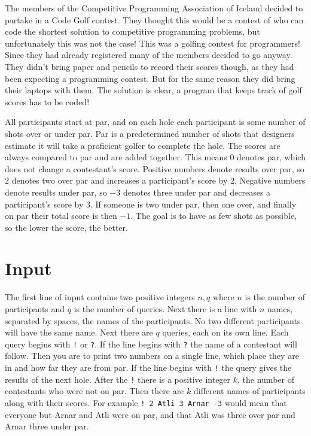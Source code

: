 
The members of the Competitive Programming Association of Iceland decided to partake in a Code Golf contest.
They thought this would be a contest of who can code the shortest solution to competitive programming problems,
but unfortunately this was not the case!
This was a golfing contest for programmers!
Since they had already registered many of the members decided to go anyway.
They didn't bring paper and pencils to record their scores though,
as they had been expecting a programming contest.
But for the same reason they did bring their laptops with them.
The solution is clear, a program that keeps track of golf scores has to be coded!

All participants start at par, and on each hole each participant is some number of shots over or under par.
Par is a predetermined number of shots that designers estimate it will take a proficient golfer to complete the hole.
The scores are always compared to par and are added together.
This means $0$ denotes par, which does not change a contestant's score.
Positive numbers denote results over par, 
so $2$ denotes two over par and increases a participant's score by $2$.
Negative numbers denote results under par, 
so $-3$ denotes three under par and decreases a participant's score by $3$.
If someone is two under par, then one over, and finally on par their total score is then $-1$.
The goal is to have as few shots as possible, so the lower the score, the better.

\section*{Input}
The first line of input contains two positive integers $n, q$ where $n$ is the number of participants
and $q$ is the number of queries.
Next there is a line with $n$ names, separated by spaces, the names of the participants.
No two different participants will have the same name.
Next there are $q$ queries, each on its own line.
Each query begins with \texttt{!} or \texttt{?}.
If the line begins with \texttt{?} the name of a contestant will follow.
Then you are to print two numbers on a single line,
which place they are in and how far they are from par.
If the line begins with \texttt{!} the query gives the results of the next hole.
After the \texttt{!} there is a positive integer $k$,
the number of contestants who were not on par.
Then there are $k$ different names of participants along with their scores.
For example \texttt{! 2 Atli 3 Arnar -3} would mean that everyone but Arnar and Atli were on par,
and that Atli was three over par and Arnar three under par.

